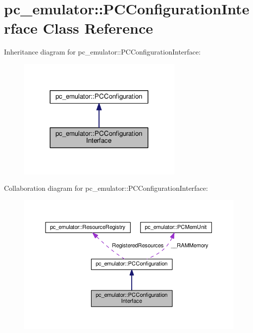 \hypertarget{classpc__emulator_1_1PCConfigurationInterface}{}\section{pc\+\_\+emulator\+:\+:P\+C\+Configuration\+Interface Class Reference}
\label{classpc__emulator_1_1PCConfigurationInterface}


Inheritance diagram for pc\+\_\+emulator\+:\+:P\+C\+Configuration\+Interface\+:
\nopagebreak
\begin{figure}[H]
\begin{center}
\leavevmode
\includegraphics[width=228pt]{classpc__emulator_1_1PCConfigurationInterface__inherit__graph}
\end{center}
\end{figure}


Collaboration diagram for pc\+\_\+emulator\+:\+:P\+C\+Configuration\+Interface\+:
\nopagebreak
\begin{figure}[H]
\begin{center}
\leavevmode
\includegraphics[width=350pt]{classpc__emulator_1_1PCConfigurationInterface__coll__graph}
\end{center}
\end{figure}
